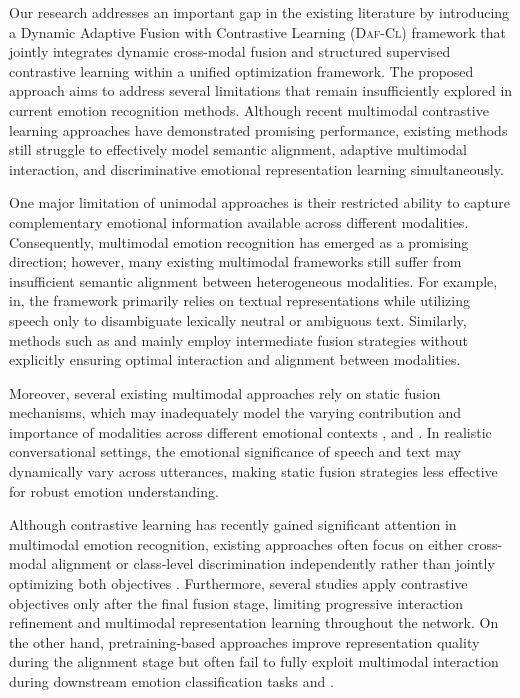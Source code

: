 Our research addresses an important gap in the existing literature by introducing a Dynamic Adaptive Fusion with Contrastive Learning (\textsc{Daf-Cl}) framework that jointly integrates dynamic cross-modal fusion and structured supervised contrastive learning within a unified optimization framework. The proposed approach aims to address several limitations that remain insufficiently explored in current emotion recognition methods. Although recent multimodal contrastive learning approaches have demonstrated promising performance, existing methods still struggle to effectively model semantic alignment, adaptive multimodal interaction, and discriminative emotional representation learning simultaneously.

One major limitation of unimodal approaches is their restricted ability to capture complementary emotional information available across different modalities\cite{Cortiz2022, Batbaatar2019, Han2023, Mustaqeem2020, Venkataramanan2019, Novais2023, Atmaja2022, Yingzhi2021}. Consequently, multimodal emotion recognition has emerged as a promising direction; however, many existing multimodal frameworks still suffer from insufficient semantic alignment between heterogeneous modalities. For example, in\cite{Koudounas2026}, the framework primarily relies on textual representations while utilizing speech only to disambiguate lexically neutral or ambiguous text. Similarly, methods such as\cite{PAYALA2026, Dikbiyik2025} and\cite{ISLAM2026} mainly employ intermediate fusion strategies without explicitly ensuring optimal interaction and alignment between modalities.

Moreover, several existing multimodal approaches rely on static fusion mechanisms, which may inadequately model the varying contribution and importance of modalities across different emotional contexts \cite{Chen2020, Dikbiyik2025}, and \cite{Sebastian2019}. In realistic conversational settings, the emotional significance of speech and text may dynamically vary across utterances, making static fusion strategies less effective for robust emotion understanding.

Although contrastive learning has recently gained significant attention in multimodal emotion recognition, existing approaches often focus on either cross-modal alignment or class-level discrimination independently rather than jointly optimizing both objectives \cite{qian2022, Kim2023, Shi2024}. Furthermore, several studies apply contrastive objectives only after the final fusion stage, limiting progressive interaction refinement and multimodal representation learning throughout the network\cite{Kim2023, Shi2024, Li2025}. On the other hand, pretraining-based approaches improve representation quality during the alignment stage but often fail to fully exploit multimodal interaction during downstream emotion classification tasks \cite{Jing2026} and \cite{Nguyen2024}.

